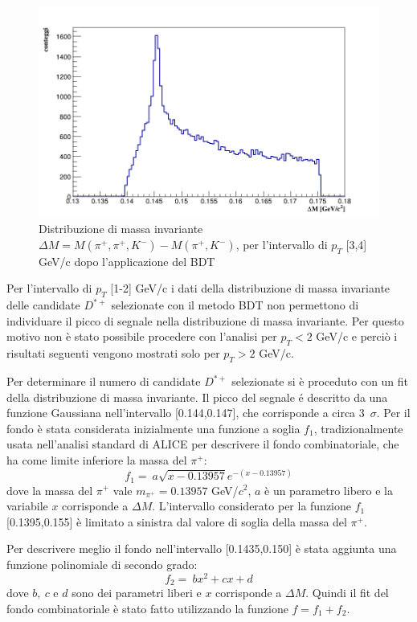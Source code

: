  \begin{figure}[htbp] 
        \centering
        \includegraphics[width=0.7\linewidth]{AnalisiDati/diffDstarD0_3_4BDT.png}
        \caption{Distribuzione di massa invariante $\Delta M = M(\pi^+,\pi^+,K^-) - M(\pi^+,K^-)$, per l'intervallo di $p_T$ [3,4] GeV/c dopo l'applicazione del BDT}
        \label{fig:diffDstarD0_3_4_BDT}
    \end{figure}
 
Per l'intervallo di $p_T$ [1-2] GeV/c i dati della distribuzione di massa invariante delle candidate $D^{*+}$ selezionate con il metodo BDT non permettono di individuare il picco di segnale nella distribuzione di massa invariante. Per questo motivo non \`e stato possibile procedere con l'analisi per $p_T < 2$ GeV/c e perciò i risultati seguenti vengono mostrati solo per $p_T > 2$ GeV/c.   

Per determinare il numero di candidate $D^{*+}$ selezionate si è proceduto con un fit della distribuzione di massa invariante. 
Il picco del segnale é descritto da una funzione Gaussiana nell'intervallo [0.144,0.147], che corrisponde a circa 3~$\sigma$.
Per il fondo \`e stata considerata inizialmente una funzione a soglia $f_1$, tradizionalmente usata nell'analisi standard di ALICE per descrivere il fondo combinatoriale, che ha come limite inferiore la massa del $\pi^+$:
\begin{equation}
        f_1  = \ a \sqrt{x-0.13957} e^{- (x - 0.13957) }
    \end{equation}
dove la massa del $\pi^+$ vale $m_{\pi^+} = 0.13957$ GeV/$c^2$, $a$ \`e un parametro libero e la variabile $x$ corrisponde a $\Delta M$. L'intervallo considerato per la funzione $f_1$ [0.1395,0.155] \`e limitato a sinistra dal valore di soglia della massa del $\pi^+$. 
    
Per descrivere meglio il fondo nell'intervallo [0.1435,0.150] \`e stata aggiunta una funzione polinomiale di secondo grado:     
    \begin{equation}
        f_2 = \ b x^2 + c x + d
    \end{equation}
dove $b, \ c$ e $d$ sono dei parametri liberi e $x$ corrisponde a $\Delta M$. Quindi il fit del fondo combinatoriale \`e stato fatto utilizzando la funzione $f = f_1 + f_2$.

